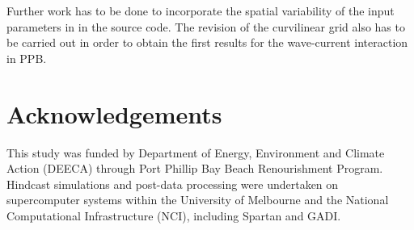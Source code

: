 \documentclass[12pt]{article}
\begin{document}
Further work has to be done to incorporate the spatial variability of the input parameters in \textcite{Smith2011} in the source code. The revision of the curvilinear grid also has to be carried out in order to obtain the first results for the wave-current interaction in PPB.

\newpage
\section*{Acknowledgements}

This study was funded by Department of Energy, Environment and Climate Action (DEECA) through Port Phillip Bay Beach Renourishment Program. Hindcast simulations and post-data processing were undertaken on supercomputer systems within the University of Melbourne and the National Computational Infrastructure (NCI), including Spartan and GADI.

\newpage
\printbibliography

\newpage
\end{document}
